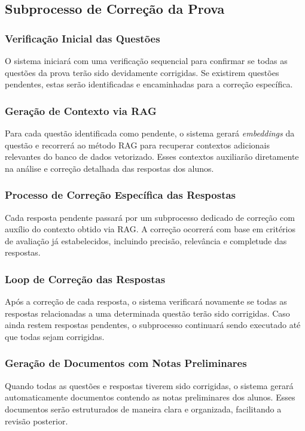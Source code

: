 \subsection{Subprocesso de Correção da Prova}

\subsubsection{Verificação Inicial das Questões}
O sistema iniciará com uma verificação sequencial para confirmar se todas as questões da prova terão sido devidamente corrigidas. Se existirem questões pendentes, estas serão identificadas e encaminhadas para a correção específica.

\subsubsection{Geração de Contexto via RAG}
Para cada questão identificada como pendente, o sistema gerará \textit{embeddings} da questão e recorrerá ao método RAG para recuperar contextos adicionais relevantes do banco de dados vetorizado. Esses contextos auxiliarão diretamente na análise e correção detalhada das respostas dos alunos.

\subsubsection{Processo de Correção Específica das Respostas}
Cada resposta pendente passará por um subprocesso dedicado de correção com auxílio do contexto obtido via RAG. A correção ocorrerá com base em critérios de avaliação já estabelecidos, incluindo precisão, relevância e completude das respostas.

\subsubsection{Loop de Correção das Respostas}
Após a correção de cada resposta, o sistema verificará novamente se todas as respostas relacionadas a uma determinada questão terão sido corrigidas. Caso ainda restem respostas pendentes, o subprocesso continuará sendo executado até que todas sejam corrigidas.

\subsubsection{Geração de Documentos com Notas Preliminares}
Quando todas as questões e respostas tiverem sido corrigidas, o sistema gerará automaticamente documentos contendo as notas preliminares dos alunos. Esses documentos serão estruturados de maneira clara e organizada, facilitando a revisão posterior.

